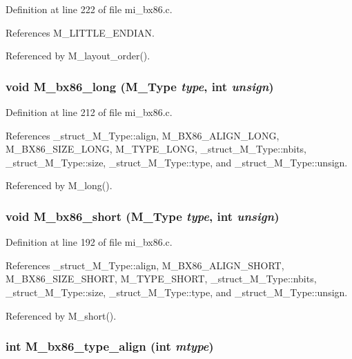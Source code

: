 Definition at line 222 of file mi\_\-bx86.c.

References M\_\-LITTLE\_\-ENDIAN.

Referenced by M\_\-layout\_\-order().
\subsubsection{\setlength{\rightskip}{0pt plus 5cm}void M\_\-bx86\_\-long (\bf{M\_\-Type} {\em type}, int {\em unsign})}\label{mi__bx86_8c_bfca10da51412ea3725b11612cd2aede}




Definition at line 212 of file mi\_\-bx86.c.

References \_\-struct\_\-M\_\-Type::align, M\_\-BX86\_\-ALIGN\_\-LONG, M\_\-BX86\_\-SIZE\_\-LONG, M\_\-TYPE\_\-LONG, \_\-struct\_\-M\_\-Type::nbits, \_\-struct\_\-M\_\-Type::size, \_\-struct\_\-M\_\-Type::type, and \_\-struct\_\-M\_\-Type::unsign.

Referenced by M\_\-long().
\subsubsection{\setlength{\rightskip}{0pt plus 5cm}void M\_\-bx86\_\-short (\bf{M\_\-Type} {\em type}, int {\em unsign})}\label{mi__bx86_8c_d893007e4234cdc2a154a7019e66b3a4}




Definition at line 192 of file mi\_\-bx86.c.

References \_\-struct\_\-M\_\-Type::align, M\_\-BX86\_\-ALIGN\_\-SHORT, M\_\-BX86\_\-SIZE\_\-SHORT, M\_\-TYPE\_\-SHORT, \_\-struct\_\-M\_\-Type::nbits, \_\-struct\_\-M\_\-Type::size, \_\-struct\_\-M\_\-Type::type, and \_\-struct\_\-M\_\-Type::unsign.

Referenced by M\_\-short().
\subsubsection{\setlength{\rightskip}{0pt plus 5cm}int M\_\-bx86\_\-type\_\-align (int {\em mtype})}\label{mi__bx86_8c_1332b69cea771071165132f5da62fd02}




